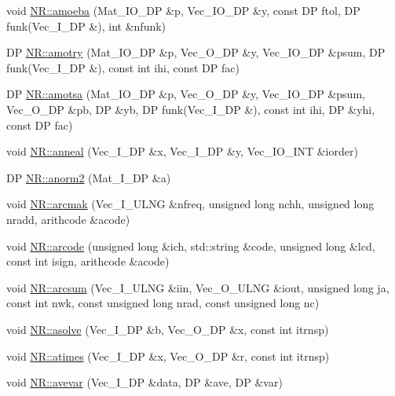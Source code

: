 \begin{DoxyCompactItemize}
\item 
void \mbox{\hyperlink{namespaceNR_a55aa747fecbb0e45dc63e070662c6e2c}{N\+R\+::amoeba}} (Mat\+\_\+\+I\+O\+\_\+\+DP \&p, Vec\+\_\+\+I\+O\+\_\+\+DP \&y, const DP ftol, DP funk(Vec\+\_\+\+I\+\_\+\+DP \&), int \&nfunk)
\item 
DP \mbox{\hyperlink{namespaceNR_a752225a62f24c2b80c703fd887f5c56e}{N\+R\+::amotry}} (Mat\+\_\+\+I\+O\+\_\+\+DP \&p, Vec\+\_\+\+O\+\_\+\+DP \&y, Vec\+\_\+\+I\+O\+\_\+\+DP \&psum, DP funk(Vec\+\_\+\+I\+\_\+\+DP \&), const int ihi, const DP fac)
\item 
DP \mbox{\hyperlink{namespaceNR_a2f1f661e2421d96e8602ab14e7825666}{N\+R\+::amotsa}} (Mat\+\_\+\+I\+O\+\_\+\+DP \&p, Vec\+\_\+\+O\+\_\+\+DP \&y, Vec\+\_\+\+I\+O\+\_\+\+DP \&psum, Vec\+\_\+\+O\+\_\+\+DP \&pb, DP \&yb, DP funk(Vec\+\_\+\+I\+\_\+\+DP \&), const int ihi, DP \&yhi, const DP fac)
\item 
void \mbox{\hyperlink{namespaceNR_a65844d09b0713b4ceedf062342980ed3}{N\+R\+::anneal}} (Vec\+\_\+\+I\+\_\+\+DP \&x, Vec\+\_\+\+I\+\_\+\+DP \&y, Vec\+\_\+\+I\+O\+\_\+\+I\+NT \&iorder)
\item 
DP \mbox{\hyperlink{namespaceNR_af5ce2ea46359aa499509ecbaff2c19df}{N\+R\+::anorm2}} (Mat\+\_\+\+I\+\_\+\+DP \&a)
\item 
void \mbox{\hyperlink{namespaceNR_a3e98d20522b73c2270f4a8ec4676500f}{N\+R\+::arcmak}} (Vec\+\_\+\+I\+\_\+\+U\+L\+NG \&nfreq, unsigned long nchh, unsigned long nradd, arithcode \&acode)
\item 
void \mbox{\hyperlink{namespaceNR_a7638af127fe6942f24780c5e4c284138}{N\+R\+::arcode}} (unsigned long \&ich, std\+::string \&code, unsigned long \&lcd, const int isign, arithcode \&acode)
\item 
void \mbox{\hyperlink{namespaceNR_adea26b3b53b427d36dacd90db22fc5e2}{N\+R\+::arcsum}} (Vec\+\_\+\+I\+\_\+\+U\+L\+NG \&iin, Vec\+\_\+\+O\+\_\+\+U\+L\+NG \&iout, unsigned long ja, const int nwk, const unsigned long nrad, const unsigned long nc)
\item 
void \mbox{\hyperlink{namespaceNR_a73116d8e72803b4f516bbb3cd7dcd4a0}{N\+R\+::asolve}} (Vec\+\_\+\+I\+\_\+\+DP \&b, Vec\+\_\+\+O\+\_\+\+DP \&x, const int itrnsp)
\item 
void \mbox{\hyperlink{namespaceNR_a262c43d532c94b65394e128aa2bf565c}{N\+R\+::atimes}} (Vec\+\_\+\+I\+\_\+\+DP \&x, Vec\+\_\+\+O\+\_\+\+DP \&r, const int itrnsp)
\item 
void \mbox{\hyperlink{namespaceNR_a2a23625f7925fb351b9fb826f5fef1cf}{N\+R\+::avevar}} (Vec\+\_\+\+I\+\_\+\+DP \&data, DP \&ave, DP \&var)

\end{DoxyCompactItemize}
